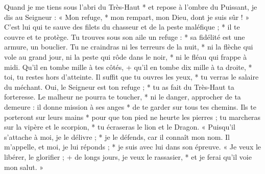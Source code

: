 Quand je me tiens sous l'abri du Très-Haut *
et repose à l'ombre du Puissant,
\versseparator
je dis au Seigneur : « Mon refuge, *
mon rempart, mon Dieu, dont je suis sûr ! »
\versseparator
C'est lui qui te sauve des filets du chasseur
et de la peste maléfique ; *
il te couvre et te protège.
\versseparator
Tu trouves sous son aile un refuge : *
sa fidélité est une armure, un bouclier.
\versseparator
Tu ne craindras ni les terreurs de la nuit, *
ni la flèche qui vole au grand jour,
\versseparator
ni la peste qui rôde dans le noir, *
ni le fléau qui frappe à midi.
\versseparator
Qu'il en tombe mille à tes côtés, +
qu'il en tombe dix mille à ta droite, *
toi, tu restes hors d'atteinte.
\versseparator
Il suffit que tu ouvres les yeux, *
tu verras le salaire du méchant.
\versseparator
Oui, le Seigneur est ton refuge ; *
tu as fait du Très-Haut ta forteresse.
\versseparator
Le malheur ne pourra te toucher, *
ni le danger, approcher de ta demeure :
\versseparator
il donne mission à ses anges *
de te garder sur tous tes chemins.
\versseparator
Ils te porteront sur leurs mains *
pour que ton pied ne heurte les pierres ;
\versseparator
tu marcheras sur la vipère et le scorpion, *
tu écraseras le lion et le Dragon.
\versseparator
« Puisqu'il s'attache à moi, je le délivre ; *
je le défends, car il connaît mon nom.
\versseparator
Il m'appelle, et moi, je lui réponds ; *
je suis avec lui dans son épreuve.
\versseparator
« Je veux le libérer, le glorifier ; +
de longs jours, je veux le rassasier, *
et je ferai qu'il voie mon salut. »
